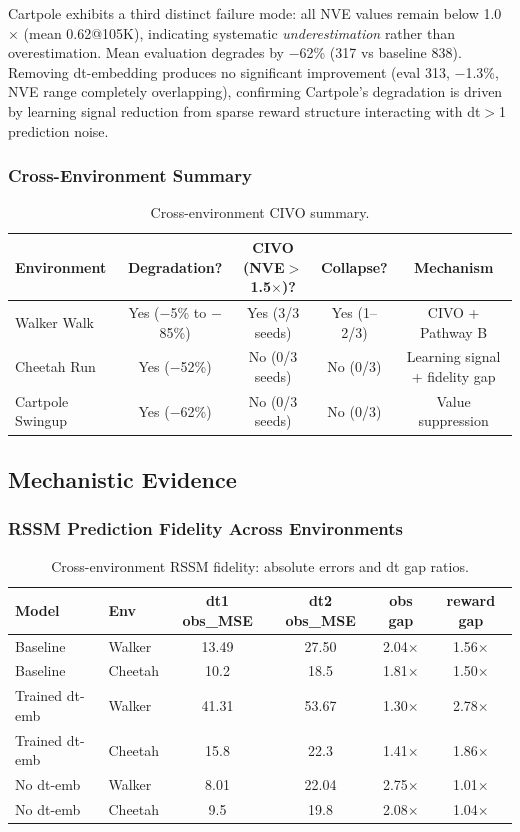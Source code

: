 \documentclass[10pt,letterpaper]{article}
\begin{document}
Cartpole exhibits a third distinct failure mode: all NVE values remain below 1.0$\times$ (mean 0.62@105K), indicating systematic \emph{underestimation} rather than overestimation. Mean evaluation degrades by $-$62\% (317 vs baseline 838). Removing dt-embedding produces no significant improvement (eval 313, $-$1.3\%, NVE range completely overlapping), confirming Cartpole's degradation is driven by learning signal reduction from sparse reward structure interacting with dt$>$1 prediction noise.

\subsubsection{Cross-Environment Summary}

\begin{table}[h]
\centering
\caption{Cross-environment CIVO summary.}
\label{tab:crossenv_summary}
\begin{tabular}{lcccc}
\toprule
Environment & Degradation? & CIVO (NVE$>$1.5$\times$)? & Collapse? & Mechanism \\
\midrule
Walker Walk & Yes ($-$5\% to $-$85\%) & Yes (3/3 seeds) & Yes (1--2/3) & CIVO + Pathway B \\
Cheetah Run & Yes ($-$52\%) & No (0/3 seeds) & No (0/3) & Learning signal + fidelity gap \\
Cartpole Swingup & Yes ($-$62\%) & No (0/3 seeds) & No (0/3) & Value suppression \\
\bottomrule
\end{tabular}
\end{table}

\subsection{Mechanistic Evidence}

\subsubsection{RSSM Prediction Fidelity Across Environments}

\begin{table}[h]
\centering
\caption{Cross-environment RSSM fidelity: absolute errors and dt gap ratios.}
\label{tab:rssm_fidelity}
\begin{tabular}{llcccc}
\toprule
Model & Env & dt1 obs\_MSE & dt2 obs\_MSE & obs gap & reward gap \\
\midrule
Baseline & Walker & 13.49 & 27.50 & 2.04$\times$ & 1.56$\times$ \\
Baseline & Cheetah & 10.2 & 18.5 & 1.81$\times$ & 1.50$\times$ \\
Trained dt-emb & Walker & 41.31 & 53.67 & 1.30$\times$ & 2.78$\times$ \\
Trained dt-emb & Cheetah & 15.8 & 22.3 & 1.41$\times$ & 1.86$\times$ \\
No dt-emb & Walker & 8.01 & 22.04 & 2.75$\times$ & 1.01$\times$ \\
No dt-emb & Cheetah & 9.5 & 19.8 & 2.08$\times$ & 1.04$\times$ \\
\bottomrule
\end{tabular}
\end{table}
\end{document}
